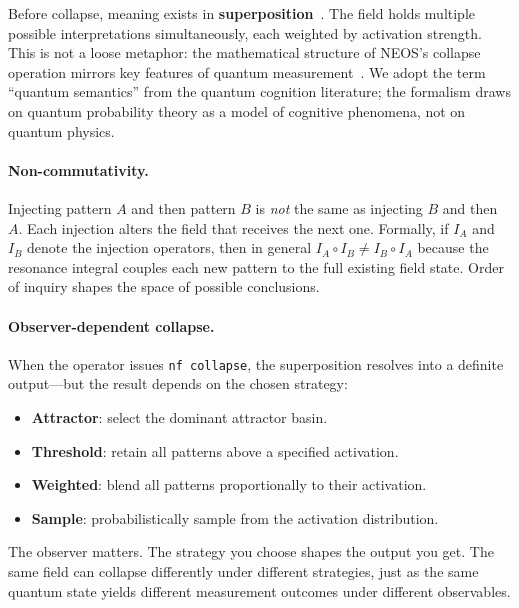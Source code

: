 Before collapse, meaning exists in
\textbf{superposition}~\cite{busemeyer2012quantum}.  The field holds
multiple possible interpretations simultaneously, each weighted by
activation strength.  This is not a loose metaphor: the mathematical
structure of NEOS's collapse operation mirrors key features of quantum
measurement~\cite{pothos2013can}.  We adopt the term ``quantum
semantics'' from the quantum cognition literature; the formalism draws
on quantum probability theory as a model of cognitive phenomena, not on
quantum physics.

\paragraph{Non-commutativity.}
Injecting pattern $A$ and then pattern $B$ is \emph{not} the same as
injecting $B$ and then $A$.  Each injection alters the field that
receives the next one.  Formally, if $I_A$ and $I_B$ denote the
injection operators, then in general $I_A \circ I_B \neq I_B \circ
I_A$ because the resonance integral couples each new pattern to the
full existing field state.  Order of inquiry shapes the space of
possible conclusions.

\paragraph{Observer-dependent collapse.}
When the operator issues \texttt{nf collapse}, the superposition
resolves into a definite output---but the result depends on the
chosen strategy:

\begin{itemize}[leftmargin=1.5em]
\item \textbf{Attractor}: select the dominant attractor basin.
\item \textbf{Threshold}: retain all patterns above a specified
  activation.
\item \textbf{Weighted}: blend all patterns proportionally to their
  activation.
\item \textbf{Sample}: probabilistically sample from the activation
  distribution.
\end{itemize}

\noindent
The observer matters.  The strategy you choose shapes the output you
get.  The same field can collapse differently under different
strategies, just as the same quantum state yields different
measurement outcomes under different observables.

